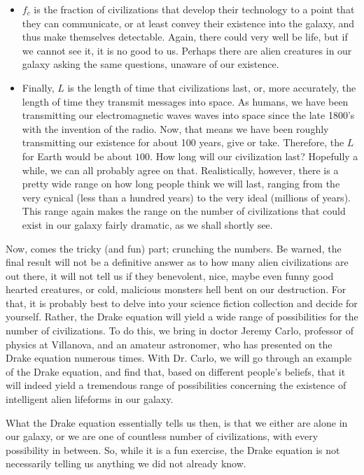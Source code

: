 \documentclass[../../fulltext/fulltext.tex]{subfiles}
\begin{document}
\begin{itemize}
\item $f_c$ is the fraction of civilizations that develop their technology to a point that they can communicate, or at least convey their existence into the galaxy, and thus make themselves detectable.  Again, there could very well be life, but if we cannot see it, it is no good to us.  Perhaps there are alien creatures in our galaxy asking the same questions, unaware of our existence.
\item Finally, $L$ is the length of time that civilizations last, or, more accurately, the length of time they transmit messages into space.  As humans, we have been transmitting our electromagnetic waves\cite{eandm} waves into space since the late 1800's with the invention of the radio.  Now, that means we have been roughly transmitting our existence for about 100 years, give or take.  Therefore, the $L$ for Earth would be about $100$. How long will our civilization last?  Hopefully a while, we can all probably agree on that. Realistically, however, there is a pretty wide range on how long people think we will last, ranging from the very cynical (less than a hundred years) to the very ideal (millions of years). This range again makes the range on the number of civilizations that could exist in our galaxy fairly dramatic, as we shall shortly see.	
\end{itemize} 

Now, comes the tricky (and fun) part; crunching the numbers.  Be warned, the final result will not be a definitive answer as to how many alien civilizations are out there, it will not tell us if they benevolent, nice, maybe even funny good hearted creatures, or cold, malicious monsters hell bent on our destruction.  For that, it is probably best to delve into your science fiction collection and decide for yourself.  Rather, the Drake equation will yield a wide range of possibilities for the number of civilizations.  To do this, we bring in doctor Jeremy Carlo, professor of physics at Villanova, and an amateur astronomer, who has presented on the Drake equation numerous times. With Dr. Carlo, we will go through an example of the Drake equation, and find that, based on different people's beliefs, that it will indeed yield a tremendous range of possibilities concerning the existence of intelligent alien lifeforms in our galaxy.

What the Drake equation essentially tells us then, is that we either are alone in our galaxy, or we are one of countless number of civilizations, with every possibility in between.  So, while it is a fun exercise, the Drake equation is not necessarily telling us anything we did not already know.
\end{document}

